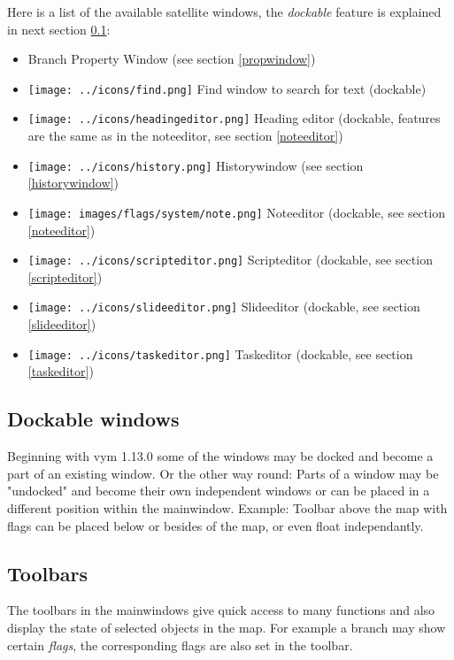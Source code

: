 \documentclass[12pt,a4paper]{article}
\newcommand{\vym}{{\sc vym }}
\begin{document}
Here is a list of the available satellite windows, the {\em dockable}
feature is explained in next section \ref{dockable}:
\begin{itemize}
    \item Branch Property Window (see section \ref{propwindow})
    \item \texttt{[image: ../icons/find.png]}
        Find window to search for text (dockable)
    \item \texttt{[image: ../icons/headingeditor.png]}
        Heading editor (dockable, features are the same as in the
        noteeditor, see section \ref {noteeditor})
    \item \texttt{[image: ../icons/history.png]}
        Historywindow (see section \ref{historywindow})
    \item \texttt{[image: images/flags/system/note.png]}
        Noteeditor (dockable, see section \ref {noteeditor})
    \item \texttt{[image: ../icons/scripteditor.png]}
        Scripteditor (dockable, see section \ref {scripteditor})
    \item \texttt{[image: ../icons/slideeditor.png]}
        Slideeditor (dockable, see section \ref {slideeditor})
    \item \texttt{[image: ../icons/taskeditor.png]}
        Taskeditor (dockable, see section \ref {taskeditor})
\end{itemize}

\subsection{Dockable windows} \label{dockable}
Beginning with \vym 1.13.0 some of the windows may be docked and become
a part of an existing window. Or the other way round: Parts of a window
may be "undocked" and become their own independent windows or can be
placed in a different position within the mainwindow. Example: Toolbar
above the map with flags can be placed below or besides of the map, or
even float independantly.

\subsection{Toolbars}
The toolbars in the mainwindows give quick access to many functions and
also display the state of selected objects in the map. For example a
branch may show certain {\em flags}, the corresponding flags are also
set in the toolbar. 
\end{document}
